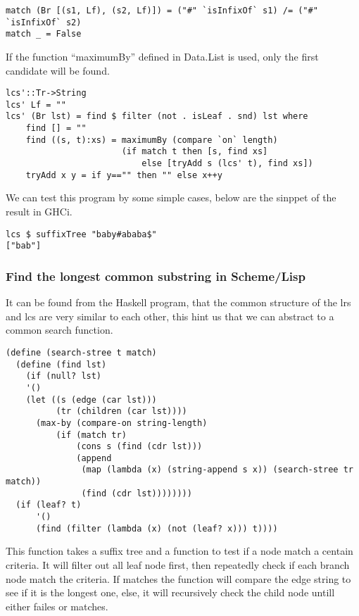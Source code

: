 \documentclass{article}
\begin{document}
\begin{lstlisting}
match (Br [(s1, Lf), (s2, Lf)]) = ("#" `isInfixOf` s1) /= ("#" `isInfixOf` s2)
match _ = False
\end{lstlisting} %

If the function ``maximumBy'' defined in Data.List is used, only
the first candidate will be found.

\begin{lstlisting}
lcs'::Tr->String
lcs' Lf = ""
lcs' (Br lst) = find $ filter (not . isLeaf . snd) lst where
    find [] = ""
    find ((s, t):xs) = maximumBy (compare `on` length) 
                       (if match t then [s, find xs]
                           else [tryAdd s (lcs' t), find xs])
    tryAdd x y = if y=="" then "" else x++y
\end{lstlisting} %

We can test this program by some simple cases, below are the
sinppet of the result in GHCi.

\begin{lstlisting}
lcs $ suffixTree "baby#ababa$"
["bab"]
\end{lstlisting}

\subsubsection*{Find the longest common substring in Scheme/Lisp}
It can be found from the Haskell program, that the common structure
of the lrs and lcs are very similar to each other, this hint us
that we can abstract to a common search function.

\lstset{language=lisp}
\begin{lstlisting}
(define (search-stree t match)
  (define (find lst)
    (if (null? lst)
	'()
	(let ((s (edge (car lst)))
	      (tr (children (car lst))))
	  (max-by (compare-on string-length) 
		  (if (match tr)
		      (cons s (find (cdr lst)))
		      (append
		       (map (lambda (x) (string-append s x)) (search-stree tr match))
		       (find (cdr lst))))))))
  (if (leaf? t)
      '()
      (find (filter (lambda (x) (not (leaf? x))) t))))
\end{lstlisting}

This function takes a suffix tree and a function to test if a node
match a centain criteria. It will filter out all leaf node first,
then repeatedly check if each branch node match the criteria. If matches
the function will compare the edge string to see if it is the longest one,
else, it will recursively check the child node untill either failes or 
matches.
\end{document}
